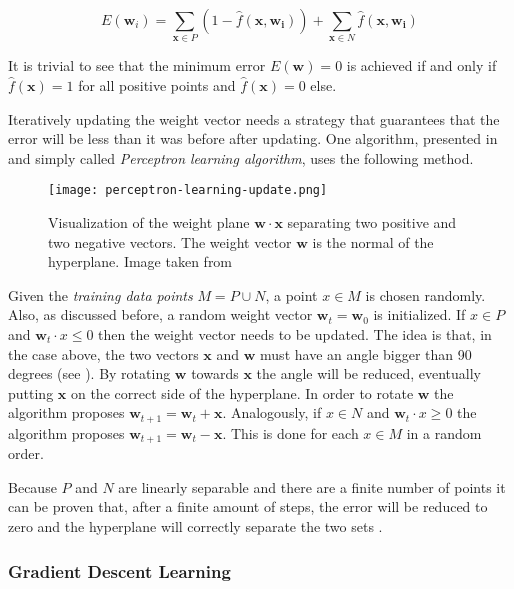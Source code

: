 \begin{equation}
    \label{eq:error-binary}
    E(\bm{w}_i) = \sum_{\bm{x} \in P} (1 - \hat{f}(\bm{x},\bm{w_i})) + \sum_{\bm{x} \in N} \hat{f}(\bm{x},\bm{w_i})
\end{equation}

It is trivial to see that the minimum error $E(\bm{w}) = 0$ is achieved if and only if $\hat{f}(\bm{x}) = 1$ for all positive points and $\hat{f}(\bm{x}) = 0$ else.

Iteratively updating the weight vector needs a strategy that guarantees that the error will be less than it was before after updating.
One algorithm, presented in \cite{rojas_neural_1996} and simply called \textit{Perceptron learning algorithm}, uses the following method.

\begin{figure}[htb!]
    \centering
    \texttt{[image: perceptron-learning-update.png]}
    \caption{Visualization of the weight plane $\bm{w} \cdot \bm{x}$ separating two positive and two negative vectors. The weight vector $\bm{w}$ is the normal of the hyperplane. Image taken from \cite{rojas_neural_1996}}
    \label{fig:perceptron-learning-update}
\end{figure}

Given the \textit{training data points} $M = P \cup N$, a point $x \in M$ is chosen randomly.
Also, as discussed before, a random weight vector $\bm{w}_t = \bm{w}_0$ is initialized.
If $x \in P$ and $\bm{w}_t \cdot x \leq 0$ then the weight vector needs to be updated.
The idea is that, in the case above, the two vectors $\bm{x}$ and $\bm{w}$ must have an angle bigger than 90 degrees (see ).
By rotating $\bm{w}$ towards $\bm{x}$ the angle will be reduced, eventually putting $\bm{x}$ on the correct side of the hyperplane.
In order to rotate $\bm{w}$ the algorithm proposes $\bm{w}_{t+1} = \bm{w}_{t} + \bm{x}$.
Analogously, if $x \in N$ and $\bm{w}_t \cdot x \geq 0$ the algorithm proposes $\bm{w}_{t+1} = \bm{w}_{t} - \bm{x}$.
This is done for each $x \in M$ in a random order.

Because $P$ and $N$ are linearly separable and there are a finite number of points it can be proven that, after a finite amount of steps, the error will be reduced to zero and the hyperplane will correctly separate the two sets \cite{rojas_neural_1996}.

\subsubsection{Gradient Descent Learning}

